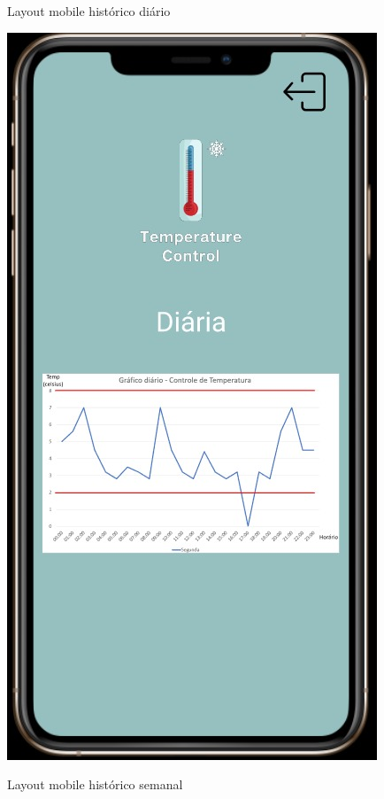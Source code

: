     \begin{figure}
        \begin{minipage}{0.5\textwidth}
            \caption{Layout mobile histórico diário}
            \centering
            \includegraphics[height=0.4\textheight]{img/mobile/temp_diaria.jpeg}
            \label{fig:mobileTempDiaria}
        \end{minipage}%
        \begin{minipage}{0.5\textwidth}
            \caption{Layout mobile histórico semanal}
            \centering

\end{minipage}
\end{figure}
